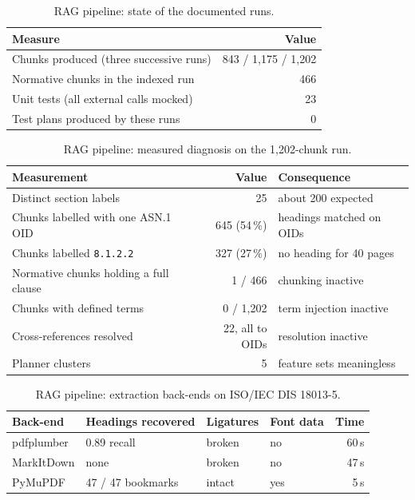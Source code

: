 \begin{table}[t]
  \centering
  \caption{RAG pipeline: state of the documented runs.}
  \label{tab:agentic-baseline}
  \begin{tabular}{lr}
    \toprule
    Measure & Value \\
    \midrule
    Chunks produced (three successive runs) & 843 / 1,175 / 1,202 \\
    Normative chunks in the indexed run     & 466 \\
    Unit tests (all external calls mocked)  & 23 \\
    Test plans produced by these runs       & 0 \\
    \bottomrule
  \end{tabular}
\end{table}

\begin{table}[t]
  \centering
  \caption{RAG pipeline: measured diagnosis on the 1,202-chunk run.}
  \label{tab:diagnosis}
  \small\setlength{\tabcolsep}{4pt}
  \begin{tabular}{lrl}
    \toprule
    Measurement & Value & Consequence \\
    \midrule
    Distinct section labels                  & 25          & about 200 expected \\
    Chunks labelled with one ASN.1 OID       & 645 (54\,\%) & headings matched on OIDs \\
    Chunks labelled \texttt{8.1.2.2}         & 327 (27\,\%) & no heading for 40 pages \\
    Normative chunks holding a full clause  & 1 / 466     & chunking inactive \\
    Chunks with defined terms                & 0 / 1,202   & term injection inactive \\
    Cross-references resolved                & 22, all to OIDs & resolution inactive \\
    Planner clusters                         & 5           & feature sets meaningless \\
    \bottomrule
  \end{tabular}
\end{table}

\begin{table}[t]
  \centering
  \caption{RAG pipeline: extraction back-ends on ISO/IEC DIS 18013-5.}
  \label{tab:backends}
  \small\setlength{\tabcolsep}{4pt}
  \begin{tabular}{llllr}
    \toprule
    Back-end & Headings recovered & Ligatures & Font data & Time \\
    \midrule
    pdfplumber & 0.89 recall & broken & no  & 60\,s \\
    MarkItDown & none                         & broken & no  & 47\,s \\
    PyMuPDF    & 47 / 47 bookmarks     & intact & yes & 5\,s \\
    \bottomrule
  \end{tabular}
\end{table}

